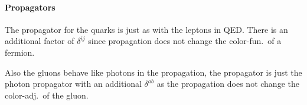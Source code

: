 \documentclass[11pt, english, fleqn, DIV=15, headinclude]{scrartcl}
\begin{document}
\paragraph{Propagators}

The propagator for the quarks is just as with the leptons in QED. There is an
additional factor of $\delta^{ij}$ since propagation does not change the
color-fun.\ of a fermion.

Also the gluons behave like photons in the propagation, the propagator is just
the photon propagator with an additional $\delta^{ab}$ as the propagation does
not change the color-adj.\ of the gluon.
\end{document}

